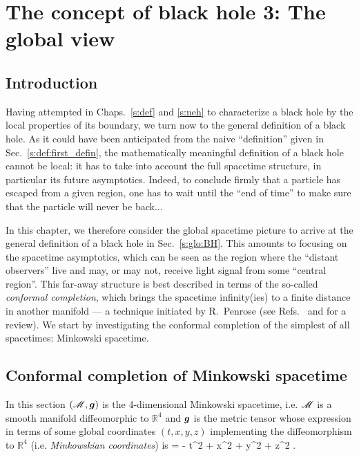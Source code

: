 \chapter{The concept of black hole 3: The global view}
\label{s:glo}

\minitoc

\section{Introduction}

Having attempted in Chaps.~\ref{s:def} and \ref{s:neh} to characterize a black hole by the local
properties of its boundary, we turn now to the general definition of a black
hole. As it could have been anticipated from the naive ``definition'' given
in Sec.~\ref{s:def:first_defin}, the mathematically meaningful definition
of a black hole cannot be local: it has to take into account the full
spacetime structure, in particular its future asymptotics. Indeed, to conclude
firmly that a particle has escaped from a given region, one has to wait until the ``end
of time'' to make sure that the particle will never be back...

In this chapter, we therefore consider the global spacetime picture to
arrive at the general definition of a black hole in
Sec.~\ref{s:glo:BH}.
This amounts to focusing on the
spacetime asymptotics, which can be seen as
the region where the ``distant observers'' live and may, or may not, receive
light signal from some ``central region''. This far-away structure is best
described in terms of the so-called \emph{conformal completion}, which brings
the spacetime infinity(ies) to a finite distance in another manifold
--- a technique initiated by R.~Penrose \cite{Penro63,Penro64} (see
Refs.~\cite{Fraue04} and \cite{Nicol17} for a review).
We start by investigating the conformal completion of the simplest
of all spacetimes: Minkowski spacetime.


\section{Conformal completion of Minkowski spacetime} \label{s:glo:conf_Mink}

In this section $(\mathscr{M},\bm{g})$ is the 4-dimensional Minkowski spacetime,
i.e. $\mathscr{M}$ is a smooth manifold diffeomorphic to $\mathbb{R}^4$ and $\bm{g}$
is the metric tensor whose expression in terms of some global coordinates
$(t, x, y, z)$ implementing the diffeomorphism to $\mathbb{R}^4$
(i.e. \emph{Minkowskian coordinates})
is
\be \label{e:glo:Mink_metric}
     = - \dd t^2 + \dd x^2 + \dd y^2 + \dd z^2 .
\ee

